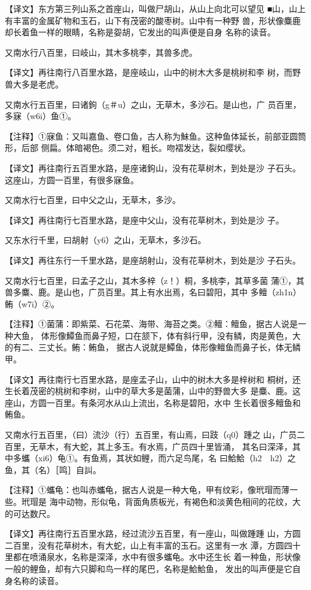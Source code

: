 \documentclass[a4paper,12pt,UTF8,twoside]{ctexbook}
\begin{document}
【译文】东方第三列山系之首座山，叫做尸胡山，从山上向北可以望见 ■山，山上有丰富的金属矿物和玉石，山下有茂密的酸枣树。山中有一种野 兽，形状像麋鹿却长着鱼一样的眼睛，名称是妴胡，它发出的叫声便是自身 名称的读音。

又南水行八百里，曰岐山，其木多桃李，其兽多虎。

【译文】再往南行八百里水路，是座岐山，山中的树木大多是桃树和李 树，而野兽大多是老虎。

又南水行五百里，曰诸鉤（g＃u）之山，无草木，多沙石。是山也，广 员百里，多寐（w6i）鱼①。

【注释】①寐鱼：又叫嘉鱼、卷口鱼，古人称为鮇鱼。这种鱼体延长，前部亚圆筒形，后部 侧扁。体暗褐色。须二对，粗长。吻褶发达，裂如缨状。

【译文】再往南行五百里水路，是座诸鉤山，没有花草树木，到处是沙 子石头。这座山，方圆一百里，有很多寐鱼。

又南水行七百里，曰中父之山，无草木，多沙。

【译文】再往南行七百里水路，是座中父山，没有花草树木，到处是沙 子。

又东水行千里，曰胡射（y6）之山，无草木，多沙石。

【译文】再往东行一千里水路，是座胡射山，没有花草树木，到处是沙 子石头。

又南水行七百里，曰孟子之山，其木多梓（z！）桐，多桃李，其草多菌 蒲①，其兽多麋、鹿。是山也，广员百里。其上有水出焉，名曰碧阳，其中 多鳣（zh1n）鲔（w7i）②。

【注释】①菌蒲：即紫菜、石花菜、海带、海苔之类。②鳣：鳣鱼，据古人说是一种大鱼， 体形像鱏鱼而鼻子短，口在颔下，体有斜行甲，没有鳞，肉是黄色，大的有二、三丈长。鲔：鲔鱼， 据古人说就是鱏鱼，体形像鳣鱼而鼻子长，体无鳞甲。

【译文】再往南行七百里水路，是座孟子山，山中的树木大多是梓树和 桐树，还生长着茂密的桃树和李树，山中的草大多是菌蒲，山中的野兽大多 是麋、鹿。这座山，方圆一百里。有条河水从山上流出，名称是碧阳，水中 生长着很多鳣鱼和鲔鱼。

又南水行五百里，（曰）流沙（行）五百里，有山焉，曰跂（q0）踵之 山，广员二百里，无草木，有大蛇，其上多玉。有水焉，广员四十里皆涌， 其名曰深泽，其中多蠵（xi6）龟①。有鱼焉，其状如鲤，而六足鸟尾，名 曰鮯鮯（h2　h2）之鱼，其（名）［鸣］自訆。

【注释】①蠵龟：也叫赤蠵龟，据古人说是一种大龟，甲有纹彩，像玳瑁而薄一些。玳瑁是 海中动物，形似龟，背面角质板光，有褐色和淡黄色相间的花纹，大的可达数尺。

【译文】再往南行五百里水路，经过流沙五百里，有一座山，叫做踵踵 山，方圆二百里，没有花草树木，有大蛇，山上有丰富的玉石。这里有一水 潭，方圆四十里都在喷涌泉水，名称是深泽，水中有很多蠵龟。水中还生长 着一种鱼，形状像一般的鲤鱼，却有六只脚和鸟一样的尾巴，名称是鮯鮯鱼， 发出的叫声便是它自身名称的读音。
\end{document}
